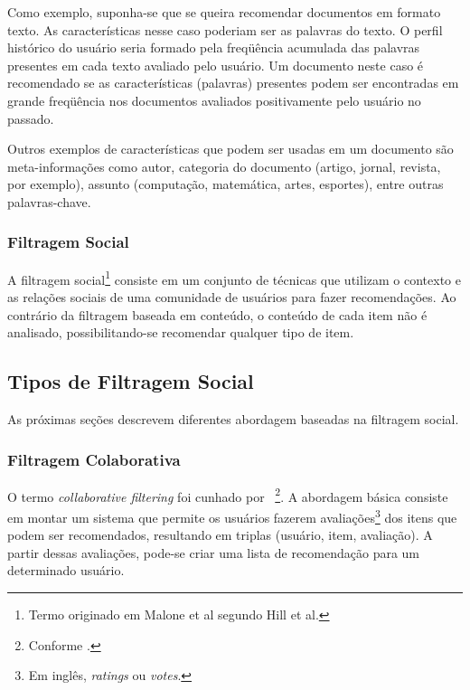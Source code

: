 Como exemplo, suponha-se que se queira recomendar documentos em formato texto. As características nesse caso poderiam ser as palavras do texto. O perfil histórico do usuário seria formado pela freqüência acumulada das palavras presentes em cada texto avaliado pelo usuário. Um documento neste caso é recomendado se as características (palavras) presentes podem ser encontradas em grande freqüência nos documentos avaliados positivamente pelo usuário no passado.

Outros exemplos de características que podem ser usadas em um documento são meta-informações como autor, categoria do documento (artigo, jornal, revista, por exemplo), assunto (computação, matemática, artes, esportes), entre outras palavras-chave.


\subsubsection{Filtragem Social} %


A filtragem social\footnote{Termo originado em Malone et al\cite{Malone87} segundo Hill et al\cite{Hill95}.} consiste em um conjunto de técnicas que utilizam o contexto e as relações sociais de uma comunidade de usuários para fazer recomendações. Ao contrário da filtragem baseada em conteúdo, o conteúdo de cada item não é analisado, possibilitando-se recomendar qualquer tipo de item.

\subsection{Tipos de Filtragem Social}

 As próximas seções descrevem diferentes abordagem baseadas na filtragem social.

\subsubsection{Filtragem Colaborativa}

O termo \textit{collaborative filtering} foi cunhado por \cite{Goldberg92}~\footnote{Conforme \cite{Resnick97}.}. A abordagem básica consiste em montar um sistema que permite os usuários fazerem avaliações\footnote{Em inglês, \textit{ratings} ou \textit{votes}.} dos itens que podem ser recomendados, resultando em triplas (usuário, item, avaliação). A partir dessas avaliações, pode-se criar uma lista de recomendação para um determinado usuário.

